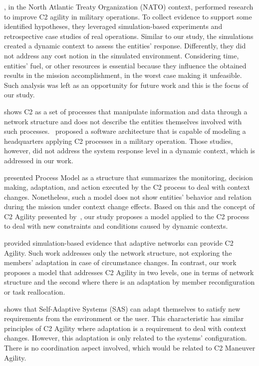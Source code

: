 \citet{FRANCE2014}, in the North Atlantic Treaty Organization (NATO) context, performed research to improve C2 agility in military operations. To collect evidence to support some identified hypotheses, they leveraged simulation-based experiments and retrospective case studies of real operations. Similar to our study, the simulations created a dynamic context to assess the entities' response. Differently, they did not address any cost notion in the simulated environment. Considering  time, entities' fuel, or other resources is essential because they influence the  obtained results in the mission accomplishment, in the worst case  making it unfeasible. Such analysis was left as an opportunity for future work and this is the focus of our study.

\citet{Swart2012} shows C2 as a set of processes that manipulate information and data through a network structure and does not describe the entities themselves involved with such processes.~\citet{Mason2001} proposed a software architecture that is capable of modeling a headquarters applying C2 processes in a military operation. Those studies, however, did not address the system response level in a dynamic context, which is addressed in our work.

\citet{Stanton2007} presented Process Model as a structure that summarizes the monitoring, decision making,  adaptation, and action executed by the C2 process to deal with context changes. Nonetheless, such a model does not show entities' behavior and relation during the mission under context change effects. Based on this and the concept of C2 Agility presented by~\citet{Alberts10}, our study proposes a model applied to the C2 process to deal with new constraints and conditions caused by dynamic contexts. 

\citet{c2-02} provided simulation-based evidence that adaptive networks can provide C2 Agility. 
Such work addresses only the network structure, not exploring the members' adaptation in case of circumstance changes. In contrast, our work proposes a model that addresses C2 Agility in two levels, one in terms of network structure and the second where there is an adaptation by member reconfiguration or task reallocation.

\citet{SAS04} shows that Self-Adaptive Systems (SAS) can adapt themselves to satisfy new requirements from the environment or the user. This characteristic has similar principles of C2 Agility where adaptation is a requirement to deal with context changes. However, this adaptation is only related to the systems' configuration. There is no coordination aspect involved, which would be related to C2 Maneuver Agility.

